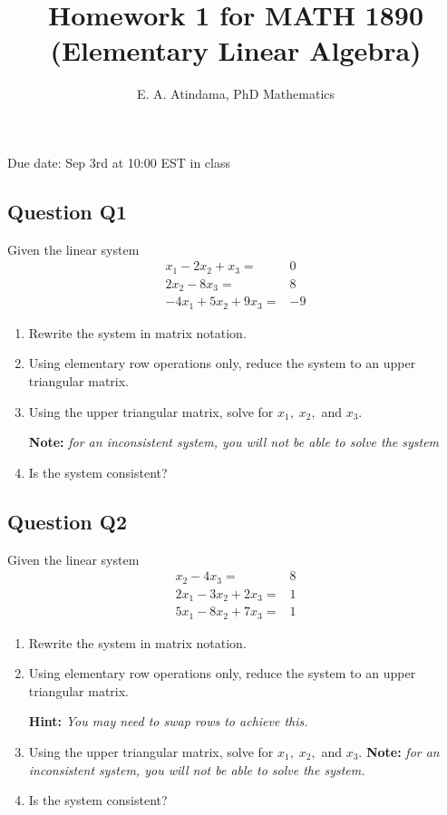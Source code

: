 \documentclass[a4paper,11pt,reqno]{amsart}
\title[MATH 1890 (Elementary Linear Algebra)]{Homework 1 for MATH 1890 (Elementary Linear Algebra)}
\author[Emmanuel Atindama]{E. A. Atindama, PhD Mathematics}
\numberwithin{equation}{section}
\begin{document}
\maketitle

Due date: Sep 3rd at 10:00 EST in class

\subsection{Question Q1}\label{sec:q1}

Given the linear system
    \begin{align*}
        x_1 - 2x_2 + x_3 =& 0\\
           2x_2 - 8x_3  =& 8\\
         -4x_1 + 5x_2 + 9x_3 =& -9
    \end{align*}
\begin{enumerate}[a]
    \item Rewrite the system in matrix notation.
    \item Using elementary row operations only, reduce the system to an upper triangular matrix.
    \item Using the upper triangular matrix, solve for \(x_1,\; x_2,\) and \(x_3\).
    
    \textbf{Note:} \emph{for an inconsistent system, you will not be able to solve the system}
    
    \item Is the system consistent?
\end{enumerate}

\subsection{Question Q2}\label{sec:q2}

Given the linear system
    \begin{align*}
        x_2 - 4x_3 =& 8\\
           2x_1 - 3x_2 + 2x_3  =& 1\\
         5x_1 - 8x_2 + 7x_3 =& 1
    \end{align*}
\begin{enumerate}[a]
    \item Rewrite the system in matrix notation.
    \item Using elementary row operations only, reduce the system to an upper triangular matrix.
    
    \textbf{Hint:} \emph{You may need to swap rows to achieve this.}
    
    \item Using the upper triangular matrix, solve for \(x_1,\; x_2,\) and \(x_3\).
    \textbf{Note:} \emph{for an inconsistent system, you will not be able to solve the system.}
    
    \item Is the system consistent?
\end{enumerate}
\end{document}
